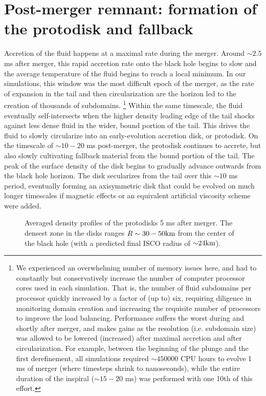 \section{Post-merger remnant: formation of the protodisk and fallback}
\label{sec:disk-analysis}

Accretion of the fluid happens at a maximal rate during the merger. 
Around $ \sim 2.5$ ms after merger, this rapid accretion rate onto the black hole begins to slow and the average temperature of the fluid begins to reach a local minimum.
In our simulations, this window was the most difficult epoch of the merger, as the rate of expansion in the tail and then circularization are the horizon led to the creation of thousands of subdomains. 
\footnote{
We experienced an overwhelming number of memory issues here, and had to constantly but conservatively increase the number of computer processor cores used in each simulation.
That is, the number of fluid subdomains per processor quickly increased by a factor of (up to) six, requiring diligence in monitoring domain creation and increasing the requisite number of processors to improve the load balancing.
Performance suffers the worst during and shortly after merger, and makes gains as the resolution (i.e. subdomain size) was allowed to be lowered (increased) after maximal accretion and after circularization.  
For example, between the beginning of the plunge and the first derefinement, all simulations required $\sim 450000$ CPU hours to evolve 1 ms of merger (where timesteps shrink to nanoseconds), while the entire duration of the inspiral ($\sim 15 - 20$ ms) was performed with one 10th of this effort. 
}
Within the same timescale, the fluid eventually self-intersects when the higher density leading edge of the tail shocks against less dense fluid in the wider, bound portion of the tail.
This drives the fluid to slowly circularize into an early-evolution accretion disk, or protodisk.
On the timescale of $\sim 10-20$ ms post-merger, the protodisk continues to accrete, but also slowly cultivating fallback material from the bound portion of the tail.
The peak of the surface density of the disk begins to gradually advance outwards from the black hole horizon.
The disk secularizes from the tail over this $\sim 10$ ms period,
eventually forming an axisymmetric disk that could be evolved on much longer timescales if magnetic effects or an equivalent artificial viscosity scheme were added.

\begin{figure}
	\centering
	
	\caption[Density profiles of the protodisks 5 ms after merger]{
		Averaged density profiles of the protodisks 5 ms after merger.  The densest zone in the disks ranges $R \sim 30 - 50 {\rm km}$ from the center of the black hole (with a predicted final ISCO radius of $\mathord{\sim} 24 {\rm km}$).  
	}
	\label{fig:diskdensities}
\end{figure}

